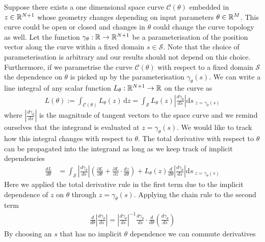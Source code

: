 Suppose there exists a one dimensional space curve $\mathcal{C(\theta)}$ embedded in $z\in\mathbb{R}^{N+1}$ whose geometry changes depending on input parameters $\theta\in\mathbb{R}^M$. This curve could be open or closed and changes in $\theta$ could change the curve topology as well. Let the function $\gamma_{\theta}:\mathbb{R}\rightarrow\mathbb{R}^{N+1}$ be a parameterisation of the position vector along the curve within a fixed domain $s\in\mathcal{S}$. Note that the choice of parameterisation is arbitrary and our results should not depend on this choice. Furthermore, if we parametrise the curve $\mathcal{C}(\theta)$ with respect to a fixed domain $\mathcal{S}$ the dependence on $\theta$ is picked up by the parameterisation $\gamma_{\theta}(s)$. We can write a line integral of any scalar function $L_{\theta}:\mathbb{R}^{N+1}\rightarrow\mathbb{R}$ on the curve as
\begin{align}
    L(\theta):=
    \int_\mathcal{C(\theta)}\! L_{\theta}(z)\,\mathrm{d}z
    =\int_\mathcal{S}\! L_{\theta}(z)\left|\frac{d\gamma_{\theta}}{ds}\right|\mathrm{d}s_{\,\,z=\gamma_{\theta}(s)}
\end{align}
where $\left|\frac{d\gamma_{\theta}}{ds}\right|$ is the magnitude of tangent vectors to the space curve and we remind ourselves that the integrand is evaluated at $z=\gamma_{\theta}(s)$. We would like to track how this integral changes with respect to $\theta$. The total derivative with respect to $\theta$ can be propagated into the integrand \cite{Flanders1973DifferentiationSign} as long as we keep track of implicit dependencies
\begin{align}
    \frac{dL}{d\theta} &=\int_\mathcal{S}
    \left|\frac{d\gamma_{\theta}}{ds}\right|
    \left(
        \frac{\partial L}{\partial\theta}+
        \frac{\partial L}{\partial z}\cdot
        \frac{dz}{d\theta}
    \right)
    +L_{\theta}(z)\frac{d}{d\theta}\left|\frac{d\gamma_{\theta}}{ds}\right|
    \mathrm{d}s_{\,\,z=\gamma_{\theta}(s)}
\end{align}
Here we applied the total derivative rule in the first term due to the implicit dependence of $z$ on $\theta$ through $z=\gamma_{\theta}(s)$. Applying the chain rule to the second term
\begin{align}
    \frac{d}{d\theta}\left|\frac{d\gamma_{\theta}}{ds}\right|=
    \left|\frac{d\gamma_{\theta}}{ds}\right|^{-1}
    \frac{d\gamma_{\theta}}{ds}\cdot\frac{d}{d\theta}
    \left(\frac{d\gamma_{\theta}}{ds}\right)
\end{align}
By choosing an $s$ that has no implicit $\theta$ dependence we can commute derivatives
